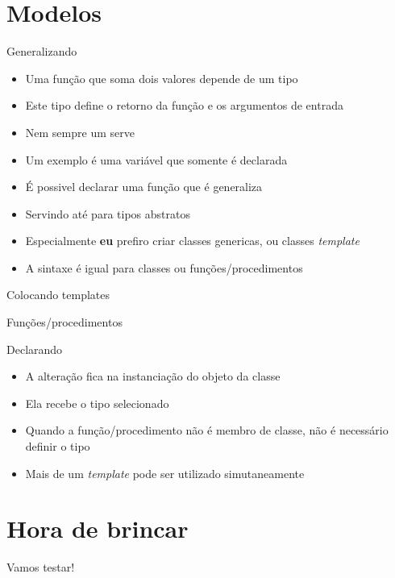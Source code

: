 \documentclass[14pt]{beamer}
\begin{document}
	\section{Modelos}
		\begin{frame}{Generalizando}
			\begin{itemize}
				\presentationPause\item Uma função que soma dois valores depende de um tipo
				\presentationPause\item Este tipo define o retorno da função e os argumentos de entrada
				\presentationPause\item Nem sempre um  serve
				\presentationPause\item Um exemplo é uma variável que somente é declarada
				\presentationPause\item É possivel declarar uma função que é generaliza
				\presentationPause\item Servindo até para tipos abstratos
				\presentationPause\item Especialmente \textbf{eu} prefiro criar classes genericas\presentationPause, ou classes \textit{template}
				\presentationPause\item A sintaxe é igual para classes ou funções/procedimentos
			\end{itemize}
		\end{frame}

		\begin{frame}{Colocando templates}
			\only<1>{}
			\only<2>{}
		\end{frame}

		\begin{frame}{Funções/procedimentos}
			\presentationPause
		\end{frame}
			
		\begin{frame}{Declarando}
			\begin{itemize}
				\presentationPause\item A alteração fica na instanciação do objeto da classe
				\presentationPause\item Ela recebe o tipo selecionado
			\end{itemize}
			\presentationPause
			\begin{itemize}
				\presentationPause\item Quando a função/procedimento não é membro de classe, não é necessário definir o tipo
				\presentationPause\item Mais de um \textit{template} pode ser utilizado simutaneamente
			\end{itemize}
		\end{frame}

	\section{Hora de brincar}
		\begin{frame}
			\begin{center}\Huge
				Vamos testar!
			\end{center}
		\end{frame}
	
\end{document}
